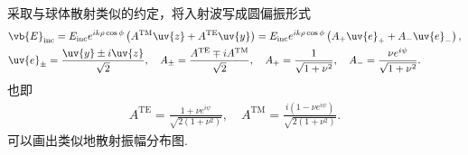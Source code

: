 \begin{exbox}
	采取与球体散射类似的约定，将入射波写成圆偏振形式
	\begin{align*}
		&\vb{E}_{\mathrm{inc}} = E_{\mathrm{inc}} e^{i k \rho \cos\phi} \left( A^{\mathrm{TM}} \uv{z} + A^{\mathrm{TE}} \uv{y} \right) = E_{\mathrm{inc}} e^{i k \rho \cos\phi} \left( A_{+} \uv{e}_{+} + A_{-} \uv{e}_{-} \right),\\
		&\uv{e}_{\pm} = \frac{\uv{y} \pm i \uv{z}}{\sqrt{2}}, \quad A_{\pm} = \frac{A^{\mathrm{TE}} \mp i A^{\mathrm{TM}}}{\sqrt{2}}, \quad A_{+} = \frac{1}{\sqrt{1 + \nu^{2}}}, \quad A_{-} = \frac{\nu e^{i\psi}}{\sqrt{1 + \nu^{2}}}.
	\end{align*}
	也即
	\begin{align*}
		A^{\mathrm{TE}} = \frac{1 + \nu e^{i\psi}}{\sqrt{2(1 + \nu^{2})}}, \quad A^{\mathrm{TM}} = \frac{i \left( 1 - \nu e^{i\psi} \right)}{\sqrt{2(1 + \nu^{2})}}.
	\end{align*}
	可以画出类似地散射振幅分布图.
\end{exbox}

